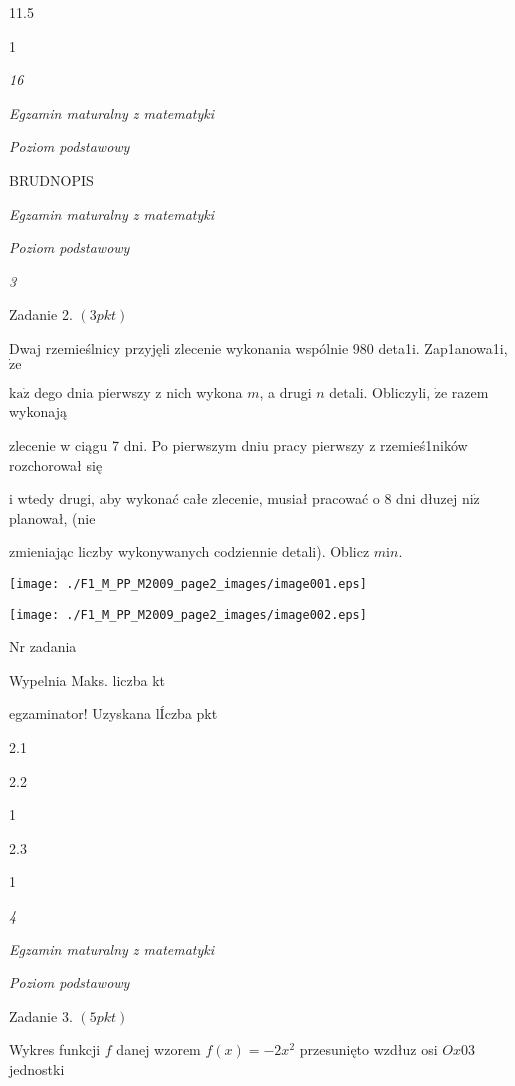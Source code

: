\documentclass[a4paper,12pt]{article}
\begin{document}
11.5

1





{\it 16}

{\it Egzamin maturalny z matematyki}

{\it Poziom podstawowy}

BRUDNOPIS





{\it Egzamin maturalny z matematyki}

{\it Poziom podstawowy}

{\it 3}

Zadanie 2. $(3pkt)$

Dwaj rzemieślnicy przyjęli zlecenie wykonania wspólnie 980 deta1i. Zap1anowa1i, $\dot{\mathrm{z}}\mathrm{e}$

$\mathrm{k}\mathrm{a}\dot{\mathrm{z}}$ dego dnia pierwszy z nich wykona $m$, a drugi $n$ detali. Obliczyli, $\dot{\mathrm{z}}\mathrm{e}$ razem wykonają

zlecenie w ciągu 7 dni. Po pierwszym dniu pracy pierwszy z rzemieś1ników rozchorował się

i wtedy drugi, aby wykonać całe zlecenie, musiał pracować o 8 dni dłuzej $\mathrm{n}\mathrm{i}\dot{\mathrm{z}}$ planował, (nie

zmieniając liczby wykonywanych codziennie detali). Oblicz $m \mathrm{i} n.$
\begin{center}
\texttt{[image: ./F1\_M\_PP\_M2009\_page2\_images/image001.eps]}

\texttt{[image: ./F1\_M\_PP\_M2009\_page2\_images/image002.eps]}
\end{center}
Nr zadania

Wypelnia Maks. liczba kt

egzaminator! Uzyskana lÍczba pkt

2.1

2.2

1

2.3

1





{\it 4}

{\it Egzamin maturalny z matematyki}

{\it Poziom podstawowy}

Zadanie 3. $(5pkt)$

Wykres funkcji $f$ danej wzorem $f(x)=-2x^{2}$ przesunięto wzdłuz osi $Ox 0 3$ jednostki
\end{document}
